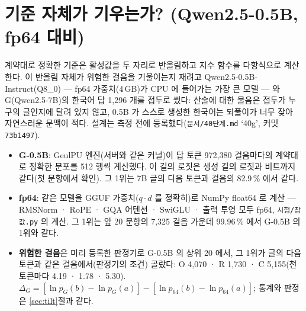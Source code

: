 \documentclass[11pt]{article}
\begin{document}
\section{기준 자체가 기우는가? (Qwen2.5-0.5B, fp64 대비)}\label{app:tilt64}

계약대로 정확한 기준은 활성값을 두 자리로 반올림하고 지수 함수를 다항식으로 계산한다. 이 반올림 자체가 위험한 걸음을 기울이는지
재려고 Qwen2.5-0.5B-Instruct(Q8\_0) --- fp64 가중치(4\,GB)가 CPU 에 들어가는 가장 큰 모델 --- 와 G(Qwen2.5-7B)의 한국어 답
1,296 개를 접두로 썼다: 산술에 대한 물음은 접두가 누구의 글인지에 달려 있지 않고, 0.5B 가 스스로 생성한 한국어는 되풀이가 너무
잦아 자연스러운 문맥이 적다. 설계는 측정 전에 등록했다(\texttt{문서/40단계.md} `40g', 커밋 \texttt{73b1497}).
\begin{itemize}
\item \textbf{G-0.5B}: GeulPU 엔진(서버와 같은 커널)이 답 토큰 972,380 걸음마다의 계약대로 정확한 분포를 512 행씩 계산했다. 이
      길의 로짓은 생성 길의 로짓과 비트까지 같다(첫 문항에서 확인). 그 1위는 7B 글의 다음 토큰과 걸음의 82.9\,\% 에서 같다.
\item \textbf{fp64}: 같은 모델을 GGUF 가중치($q\cdot d$ 를 정확히)로 NumPy float64 로 계산 --- RMSNorm · RoPE · GQA 어텐션 ·
      SwiGLU · 출력 투영 모두 fp64, \texttt{시험/참값.py} 의 계산. 그 1위는 앞 20 문항의 7,325 걸음 가운데 99.96\,\% 에서
      G-0.5B 의 1위와 같다.
\item \textbf{위험한 걸음}은 미리 등록한 판정기로 G-0.5B 의 상위 20 에서, 그 1위가 글의 다음 토큰과 같은 걸음에서(판정기의
      조건) 골랐다: O 4,070 · R 1,730 · C 5,155(천 토큰마다 4.19 · 1.78 · 5.30). $\Delta_G = [\ln p_G(b) - \ln p_G(a)] -
      [\ln p_{64}(b) - \ln p_{64}(a)]$; 통계와 판정은 \ref{sec:tilt}절과 같다.
\end{itemize}
\end{document}
